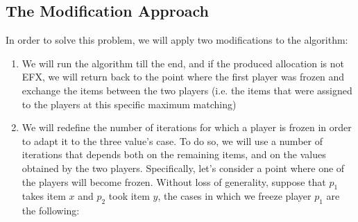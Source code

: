 \subsection{The Modification Approach}

In order to solve this problem, we will apply two modifications to the algorithm:
\begin{enumerate}
    \item We will run the algorithm till the end, and if the produced allocation is not EFX, we will return back to the point where the first player was frozen and exchange the items between the two players (i.e. the items that were assigned to the players at this specific maximum matching)
    \item We will redefine the number of iterations for which a player is frozen in order to adapt it to the three value's case. To do so, we will use a number of iterations that depends both on the remaining items, and on the values obtained by the two players. Specifically, let's consider a point where one of the players will become frozen. Without loss of generality, suppose that $p_1$ takes item $x$ and $p_2$ took item $y$,
the cases in which we freeze player $p_1$ are the following: 
\end{enumerate}


